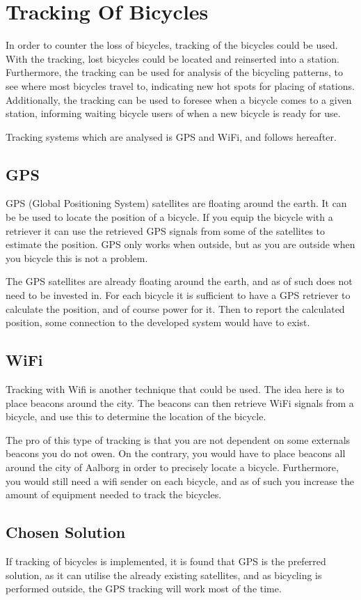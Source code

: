 \section{Tracking Of Bicycles}
In order to counter the loss of bicycles, tracking of the bicycles could be used.
With the tracking, lost bicycles could be located and reinserted into a station.
Furthermore, the tracking can be used for analysis of the bicycling patterns, to see where most bicycles travel to, indicating new hot spots for placing of stations.
Additionally, the tracking can be used to foresee when a bicycle comes to a given station, informing waiting bicycle users of when a new bicycle is ready for use.

Tracking systems which are analysed is GPS and WiFi, and follows hereafter.
\subsection{GPS}
GPS (Global Positioning System) satellites are floating around the earth.
It can be be used to locate the position of a bicycle.
If you equip the bicycle with a retriever it can use the retrieved GPS signals from some of the satellites to estimate the position.
GPS only works when outside, but as you are outside when you bicycle this is not a problem.

The GPS satellites are already floating around the earth, and as of such does not need to be invested in.
For each bicycle it is sufficient to have a GPS retriever to calculate the position, and of course power for it.
Then to report the calculated position, some connection to the developed system would have to exist.
\subsection{WiFi}
Tracking with Wifi is another technique that could be used.
The idea here is to place beacons around the city.
The beacons can then retrieve WiFi signals from a bicycle, and use this to determine the location of the bicycle.

The pro of this type of tracking is that you are not dependent on some externals beacons you do not owen.
On the contrary, you would have to place beacons all around the city of Aalborg in order to precisely locate a bicycle.
Furthermore, you would still need a wifi sender on each bicycle, and as of such you increase the amount of equipment needed to track the bicycles.

\subsection{Chosen Solution}
If tracking of bicycles is implemented, it is found that GPS is the preferred solution, as it can utilise the already existing satellites, and as bicycling is performed outside, the GPS tracking will work most of the time.